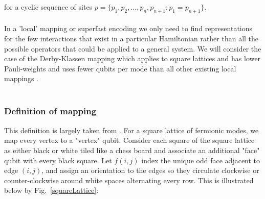 \documentclass[twoside]{article}
\begin{document}
        for a cyclic sequence of sites $p = \{p_1, p_2,\ldots, p_n, p_{n+1}: p_1 = p_{n+1} \}$.\\\\
        In a 'local' mapping or superfast encoding we only need to find representations for the few interactions that exist in a particular Hamiltonian rather than all the possible operators that could be applied to a general system. We will consider the case of the Derby-Klassen mapping which applies to square lattices and has lower Pauli-weights and uses fewer qubits per mode than all other existing local mappings \cite{derbyklassen}. \\\\
        \subsubsection{Definition of mapping}
        This definition is largely taken from \cite{derbyklassen}. For a square lattice of fermionic modes, we map every vertex to a "vertex" qubit. Consider each square of the square lattice as either black or white tiled like a chess board and associate an additional "face" qubit with every black square. Let $f(i,j)$ index the unique odd face adjacent to edge $(i,j)$, and assign an orientation to the edges so they circulate clockwise or counter-clockwise around white spaces alternating every row. This is illustrated below by Fig.~\ref{squareLattice}: 
\end{document}
